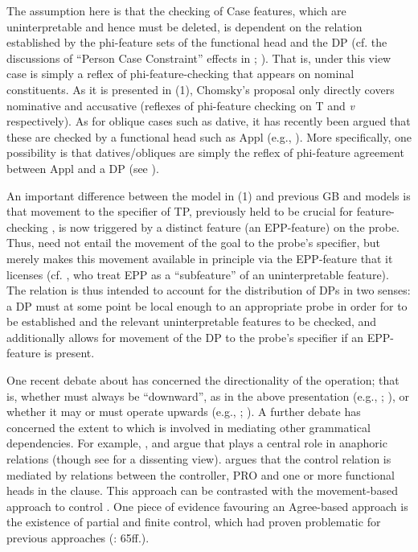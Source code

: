 \documentclass[output=paper]{langsci/langscibook}
\begin{document}
The assumption here is that the checking of Case features, which are uninterpretable and hence must be deleted, is dependent on the  relation established by the phi-feature sets of the functional head and the DP (cf. the discussions of ``Person Case Constraint'' effects in \citealt{Anagnostopoulou2003}; \citealt{Rezac2008}). That is, under this view case is simply a reflex of phi-feature-checking that appears on nominal constituents. As it is presented in (1), Chomsky’s proposal only directly covers nominative and accusative (reflexes of phi-feature checking on T and \textit{v} respectively). As for oblique cases such as dative, it has recently been argued that these are checked by a functional head such as Appl (e.g., \citealt{Cuervo2003,Pylkkaenen2008}). More specifically, one possibility is that datives\slash obliques are simply the reflex of phi-feature agreement between Appl and a DP (see \citealt{Marchis2017}).

An important difference between the model in (1) and previous GB and  models is that movement to the specifier of TP, previously held to be crucial for feature-checking \citep{Chomsky1995}, is now triggered by a distinct feature (an EPP-feature) on the probe. Thus,  need not entail the movement of the goal to the probe’s specifier, but merely makes this movement available in principle via the EPP-feature that it licenses (cf. \citealt{Pesetsky2001}, who treat EPP as a ``subfeature'' of an uninterpretable feature). The  relation is thus intended to account for the distribution of DPs in two senses: a DP must at some point be local enough to an appropriate probe in order for  to be established and the relevant uninterpretable features to be checked, and  additionally allows for movement of the DP to the probe’s specifier if an EPP-feature is present.

One recent debate about  has concerned the directionality of the operation; that is, whether  must always be ``downward'', as in the above presentation (e.g., \citealt{Chomsky2000,Chomsky2001Derivation}; \citealt{Preminger2013}), or whether it may or must operate upwards (e.g., \citealt{Zeijlstra2012}; \citealt{Ackema2018}). A further debate has concerned the extent to which  is involved in mediating other grammatical dependencies. For example, \citet{Reuland2001}, \citet{Hicks2009} and \citet{Rooryck2011} argue that  plays a central role in anaphoric relations (though see \citealt{Safir2014} for a dissenting view). \citet{Landau2000} argues that the control relation is mediated by  relations between the controller, PRO and one or more functional heads in the clause. This approach can be contrasted with the movement-based approach to control \citep{Hornstein1999,Hornstein2010}. One piece of evidence favouring an Agree-based approach is the existence of partial and finite control, which had proven problematic for previous approaches (\citealt{Landau2013}: 65ff.).
\end{document}
